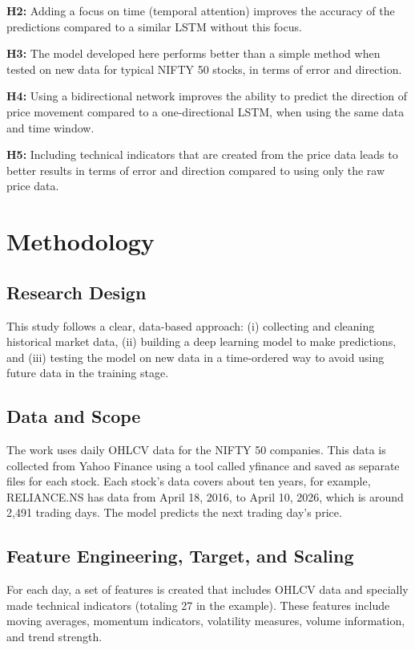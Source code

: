 \documentclass[conference]{IEEEtran}
\begin{document}
\textbf{H2:} Adding a focus on time (temporal attention) improves the accuracy of the predictions compared to a similar LSTM without this focus.

\textbf{H3:} The model developed here performs better than a simple method when tested on new data for typical NIFTY 50 stocks, in terms of error and direction.

\textbf{H4:} Using a bidirectional network improves the ability to predict the direction of price movement compared to a one-directional LSTM, when using the same data and time window.

\textbf{H5:} Including technical indicators that are created from the price data leads to better results in terms of error and direction compared to using only the raw price data.

\section{Methodology}

\subsection{Research Design}

This study follows a clear, data-based approach: (i) collecting and cleaning historical market data, (ii) building a deep learning model to make predictions, and (iii) testing the model on new data in a time-ordered way to avoid using future data in the training stage.

\subsection{Data and Scope}

The work uses daily OHLCV data for the NIFTY 50 companies. This data is collected from Yahoo Finance using a tool called yfinance and saved as separate files for each stock. Each stock's data covers about ten years, for example, RELIANCE.NS has data from April 18, 2016, to April 10, 2026, which is around 2,491 trading days. The model predicts the next trading day’s price.

\subsection{Feature Engineering, Target, and Scaling}

For each day, a set of features is created that includes OHLCV data and specially made technical indicators (totaling 27 in the example). These features include moving averages, momentum indicators, volatility measures, volume information, and trend strength.
\end{document}
